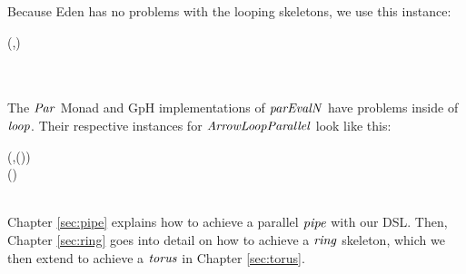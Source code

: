 \documentclass[paper=A4,twoside=true,openright,parskip=full,chapterprefix=true,headings=normal,bibliography=totoc,listof=totoc,titlepage=on,captions=tableabove,draft=false,british]{scrreprt}%
\begin{document}
Because Eden has no problems with the looping skeletons, we use this
instance:


\begin{hscode}\SaveRestoreHook
{}%
%
%
\>[B]{}\;(\;,\;\;\;\;)\Rightarrow {}\<[E]%
\\
\>[B]{}\<[5]%
\>[5]{}\;\;\;\;\;\<[E]%
\\
\>[B]{}\<[5]%
\>[5]{}\mathrel{=}\<[E]%
\\
\>[B]{}\<[5]%
\>[5]{}\;\anonymous \mathrel{=}\<[E]%
\ColumnHook
\end{hscode}\resethooks
\vspace{-2\baselineskip}

The \ensuremath{\Conid{Par}} Monad and GpH implementations of \ensuremath{\Varid{parEvalN}} have problems
inside of \ensuremath{\Varid{loop}}. Their respective instances for \ensuremath{\Conid{ArrowLoopParallel}}
look like this:


\begin{hscode}\SaveRestoreHook
{}%
%
%
\>[B]{}\;(\;,\;\;\;\;(\;))\Rightarrow {}\<[E]%
\\
\>[B]{}\<[5]%
\>[5]{}\;\;\;\;(\;)\;\<[E]%
\\
\>[B]{}\<[5]%
\>[5]{}\;\anonymous \mathrel{=}\<[E]%
\\
\>[B]{}\<[5]%
\>[5]{}\mathrel{=}\<[E]%
\ColumnHook
\end{hscode}\resethooks
\vspace{-2\baselineskip}

Chapter \ref{sec:pipe} explains how to achieve a parallel \ensuremath{\Varid{pipe}} with
our DSL. Then, Chapter \ref{sec:ring} goes into detail on how to achieve
a \ensuremath{\Varid{ring}} skeleton, which we then extend to achieve a \ensuremath{\Varid{torus}} in Chapter
\ref{sec:torus}.
\end{document}
